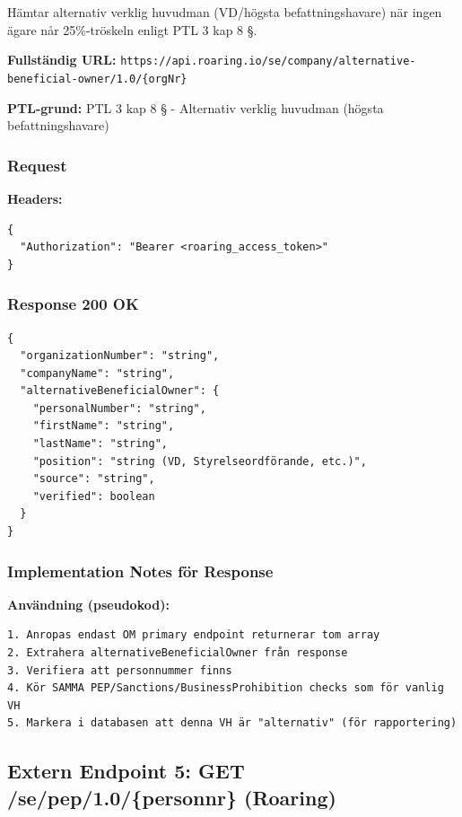 \documentclass[12pt,a4paper]{article}
\begin{document}
Hämtar alternativ verklig huvudman (VD/högsta befattningshavare) när ingen ägare når 25\%-tröskeln enligt PTL 3 kap 8 §.

\textbf{Fullständig URL:} \texttt{https://api.roaring.io/se/company/alternative-beneficial-owner/1.0/\{orgNr\}}

\textbf{PTL-grund:} PTL 3 kap 8 § - Alternativ verklig huvudman (högsta befattningshavare)

\subsubsection{Request}

\textbf{Headers:}
\begin{lstlisting}
{
  "Authorization": "Bearer <roaring_access_token>"
}
\end{lstlisting}

\subsubsection{Response 200 OK}
\begin{lstlisting}
{
  "organizationNumber": "string",
  "companyName": "string",
  "alternativeBeneficialOwner": {
    "personalNumber": "string",
    "firstName": "string",
    "lastName": "string",
    "position": "string (VD, Styrelseordförande, etc.)",
    "source": "string",
    "verified": boolean
  }
}
\end{lstlisting}

\subsubsection{Implementation Notes för Response}

\textbf{Användning (pseudokod):}
\begin{lstlisting}
1. Anropas endast OM primary endpoint returnerar tom array
2. Extrahera alternativeBeneficialOwner från response
3. Verifiera att personnummer finns
4. Kör SAMMA PEP/Sanctions/BusinessProhibition checks som för vanlig VH
5. Markera i databasen att denna VH är "alternativ" (för rapportering)
\end{lstlisting}

\subsection{Extern Endpoint 5: GET /se/pep/1.0/\{personnr\} (Roaring)}
\end{document}
